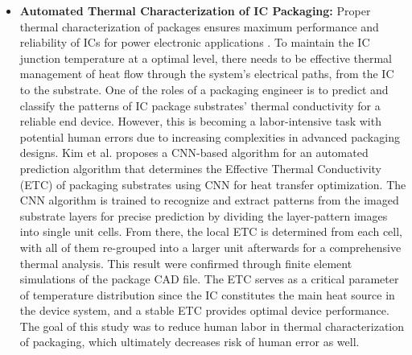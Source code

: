 \begin{itemize}
    \item \textbf{Automated Thermal Characterization of IC Packaging:} Proper thermal characterization of packages  ensures maximum performance and reliability of ICs for power electronic applications \cite{noauthor_2007-vf}. To maintain the IC junction temperature at a optimal level, there needs to be effective thermal management of heat flow through the system's electrical paths, from the IC to the substrate. One of the roles of a packaging engineer is to predict and classify the patterns of IC package substrates' thermal conductivity for a reliable end device. However, this is becoming a labor-intensive task with potential human errors due to increasing complexities in advanced packaging designs. Kim et al. \cite{Kim2022-qm} proposes a CNN-based algorithm for an automated prediction algorithm that determines the Effective Thermal Conductivity (ETC) of packaging substrates using CNN for heat transfer optimization. The CNN algorithm is trained to recognize and extract patterns from the imaged substrate layers for precise prediction by dividing the layer-pattern images into single unit cells. From there, the local ETC is determined from each cell, with all of them re-grouped into a larger unit  afterwards for a comprehensive thermal analysis. This result were confirmed through finite element simulations of the package CAD file. The ETC serves as a critical parameter of temperature distribution since the IC constitutes the main heat source in the device system, and a stable ETC provides optimal device performance. The goal of this study was to reduce human labor in thermal characterization of packaging, which ultimately decreases risk of human error as well. 



\end{itemize}
